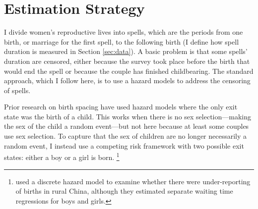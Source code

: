 \documentclass[12pt,letterpaper]{article}
\begin{document}


\section{Estimation Strategy\label{sec:strategy}}


I divide women's reproductive lives into spells, which are the periods from 
one birth, or marriage for the first spell, to the following birth
(I define how spell duration is measured in Section \ref{sec:data}).
A basic problem is that some spells' duration are censored, either
because the survey took place before the birth that would end the spell 
or because the couple has finished childbearing.
The standard approach, which I follow here, is to use a hazard models to 
address the censoring of spells.

Prior research on birth spacing have used hazard models where the only 
exit state was the birth of a child. 
This works when there is no sex selection---making the sex of the child 
a random event---but not here because at least some couples use 
sex selection. 
To capture that the sex of children are no longer necessarily a random event, 
I instead use a competing risk framework with two possible exit states: 
either a boy or a girl is born.%
\footnote{
\cite{Merli2000} used a discrete hazard model to examine whether 
there were under-reporting of births in rural China, although they 
estimated separate waiting time regressions for boys and girls.
}
\end{document}
